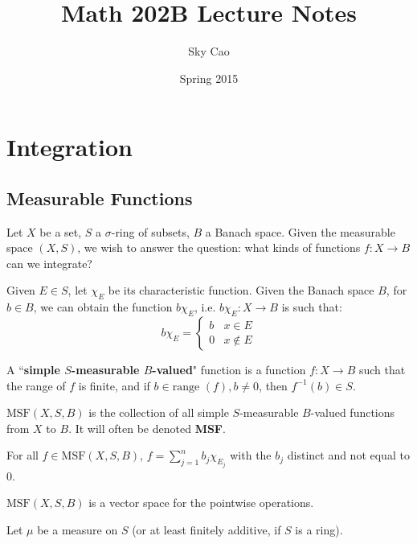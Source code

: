 \documentclass[a4paper,12pt]{report}
\title{Math 202B Lecture Notes}
\author{Sky Cao}
\date{Spring 2015}
\newcommand{\range}{ \text{range } }
\newcommand{\inv}[1] { #1^{-1} }
\newenvironment{definition}[1][Definition.]{\begin{trivlist}
\item[\hskip \labelsep {\bfseries #1}]}{\end{trivlist}}
\newenvironment{remark}[1][Remark.]{\begin{trivlist}
\item[\hskip \labelsep {\bfseries #1}]}{\end{trivlist}}
\begin{document}
	\begin{titlepage}

		\maketitle

	\end{titlepage}
	
	\chapter{Integration}
	
	\section{Measurable Functions}
	
	Let $X$ be a set, $S$ a $\sigma$-ring of subsets, $B$ a Banach space. Given the measurable space $(X, S)$, we wish to answer the question: what kinds of functions $f : X \rightarrow B$ can we integrate?
	
	Given $E \in S$, let $\chi_E$ be its characteristic function. Given the Banach space $B$, for $b \in B$, we can obtain the function $b\chi_E$, i.e. $b\chi_E : X \rightarrow B$ is such that:
	\[ b\chi_E = \begin{cases}
					b & x \in E \\
					0 & x \notin E
				\end{cases}
	\]
	
	\begin{definition}
	A ``\textbf{simple $S$-measurable $B$-valued}" function is a function $f : X \rightarrow B$ such that the range of $f$ is finite, and if $b \in \range(f), b \neq 0$, then $\inv{f}(b) \in S$. 
	\end{definition}
	
	\begin{definition}
	$\text{MSF}(X, S, B)$ is the collection of all simple $S$-measurable $B$-valued functions from $X$ to $B$. It will often be denoted \textbf{MSF}. 
	\end{definition}
	
	\begin{remark}
	For all $f \in \text{MSF}(X, S, B)$, $f = \sum_{j=1}^n b_j\chi_{E_j}$ with the $b_j$ distinct and not equal to 0. 
	\end{remark}
	
	\begin{remark}
	$\text{MSF}(X, S, B)$ is a vector space for the pointwise operations. 
	\end{remark}
	Let $\mu$ be a measure on $S$ (or at least finitely additive, if $S$ is a ring). 
	
\end{document}
